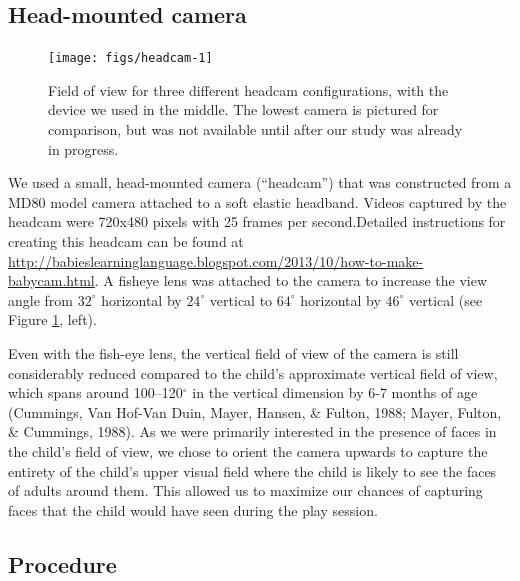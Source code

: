 \documentclass[10pt, letterpaper]{article}
\newenvironment{CodeChunk}{}{}
\begin{document}
\subsection{Head-mounted camera}\label{head-mounted-camera}

\begin{CodeChunk}
\begin{figure}[H]

{\centering \texttt{[image: figs/headcam-1]} 

}

\caption[Field of view for three different headcam configurations, with the device we used in the middle]{Field of view for three different headcam configurations, with the device we used in the middle. The lowest camera is pictured for comparison, but was not available until after our study was already in progress.}\label{fig:headcam}
\end{figure}
\end{CodeChunk}

We used a small, head-mounted camera (``headcam'') that was constructed
from a MD80 model camera attached to a soft elastic headband. Videos
captured by the headcam were 720x480 pixels with 25 frames per
second.Detailed instructions for creating this headcam can be found at
\url{http://babieslearninglanguage.blogspot.com/2013/10/how-to-make-babycam.html}.
A fisheye lens was attached to the camera to increase the view angle
from \(32^{\circ}\) horizontal by \(24^{\circ}\) vertical to
\(64^{\circ}\) horizontal by \(46^{\circ}\) vertical (see Figure
\ref{fig:headcam}, left).

Even with the fish-eye lens, the vertical field of view of the camera is
still considerably reduced compared to the child's approximate vertical
field of view, which spans around 100--120\(^{\circ}\) in the vertical
dimension by 6-7 months of age (Cummings, Van Hof-Van Duin, Mayer,
Hansen, \& Fulton, 1988; Mayer, Fulton, \& Cummings, 1988). As we were
primarily interested in the presence of faces in the child's field of
view, we chose to orient the camera upwards to capture the entirety of
the child's upper visual field where the child is likely to see the
faces of adults around them. This allowed us to maximize our chances of
capturing faces that the child would have seen during the play session.

\subsection{Procedure}\label{procedure}
\end{document}
